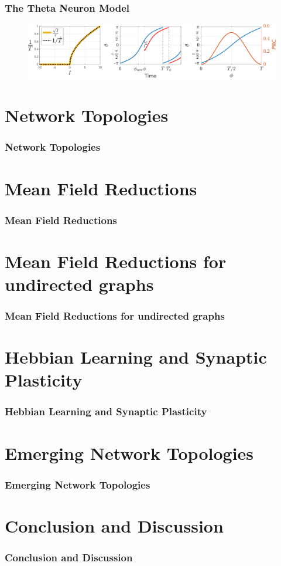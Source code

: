 \begin{frame}
\frametitle{The Theta Neuron Model}
\begin{figure}[H]
\centering
\includegraphics[width = \textwidth]{../Figures/ThetaNeuronfIandPRC.pdf}
\label{fig:ThetaNeuronfIandPRC}
\end{figure}
\end{frame}



\section{Network Topologies}
\begin{frame}
\frametitle{Network Topologies}
\end{frame}


\section{Mean Field Reductions}
\begin{frame}
\frametitle{Mean Field Reductions}
\end{frame}

\section{\mywork Mean Field Reductions for undirected graphs} 
\begin{frame}
\frametitle{\mywork Mean Field Reductions for undirected graphs} 
\end{frame}


\section{Hebbian Learning and Synaptic Plasticity} 
\begin{frame}
\frametitle{Hebbian Learning and Synaptic Plasticity}
\end{frame}


\section{\mywork Emerging Network Topologies} 
\begin{frame}
\frametitle{\mywork Emerging Network Topologies}
\end{frame}


\section{Conclusion and Discussion} 
\begin{frame}
\frametitle{Conclusion and Discussion}
\end{frame}
